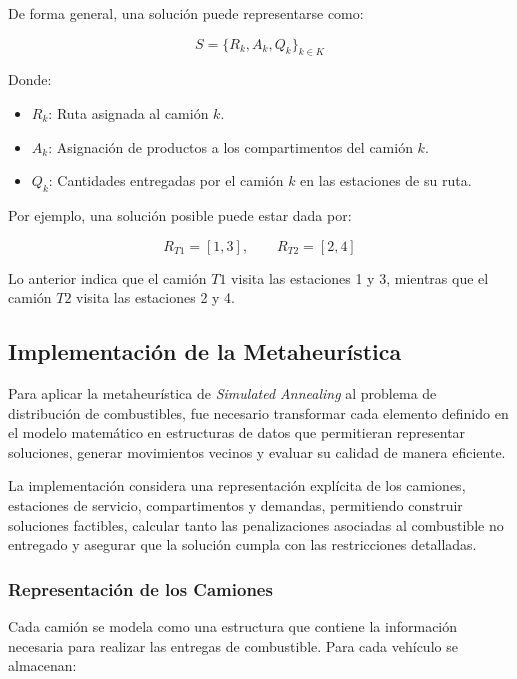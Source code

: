 De forma general, una solución puede representarse como:

\begin{equation*}
S = \{R_k, A_k, Q_k\}_{k \in K}
\end{equation*}

Donde:

\begin{itemize}
    \item $R_k$: Ruta asignada al camión $k$.
    \item $A_k$: Asignación de productos a los compartimentos del camión $k$.
    \item $Q_k$: Cantidades entregadas por el camión $k$ en las estaciones de su ruta.
\end{itemize}

Por ejemplo, una solución posible puede estar dada por:

\begin{equation*}
R_{T1} = [1,3], \qquad R_{T2} = [2,4]
\end{equation*}

Lo anterior indica que el camión $T1$ visita las estaciones 1 y 3, mientras que el camión $T2$ visita las estaciones 2 y 4.

\subsection{Implementación de la Metaheurística}

Para aplicar la metaheurística de \textit{Simulated Annealing} al problema de distribución de combustibles, fue necesario transformar cada elemento definido en el modelo matemático en estructuras de datos que permitieran representar soluciones, generar movimientos vecinos y evaluar su calidad de manera eficiente.

La implementación considera una representación explícita de los camiones, estaciones de servicio, compartimentos y demandas, permitiendo construir soluciones factibles, calcular tanto las penalizaciones asociadas al combustible no entregado y asegurar que la solución cumpla con las restricciones detalladas. 

\subsubsection{Representación de los Camiones}

Cada camión se modela como una estructura que contiene la información necesaria para realizar las entregas de combustible. Para cada vehículo se almacenan:

